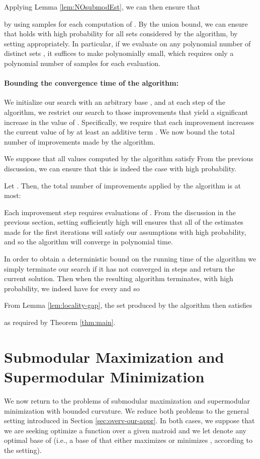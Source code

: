 \documentclass{article}
\theoremstyle{definition}
\begin{document}
Applying Lemma \ref{lem:NOsubmodEst}, we can then ensure that

by using  samples for each computation of .  By the union bound, we can ensure that  holds with high probability for all sets  considered by the algorithm, by setting  appropriately.  In particular, if we evaluate  on any polynomial number of distinct sets , it suffices to make  polynomially small, which requires only  a polynomial number of samples for each evaluation.

\paragraph{Bounding the convergence time of the algorithm:}

We initialize our search with an arbitrary base , and at each step of the algorithm, we restrict our search to those improvements that yield a significant increase in the value of .  Specifically, we require that each improvement increases the current value of  by at least an additive term .  We now bound the total number of improvements made by the algorithm.

We suppose that all values  computed by the algorithm satisfy
  From the previous discussion, we can ensure that this is indeed the case with high probability.

Let .  Then, the total number of improvements applied by the algorithm is at most:

Each improvement step requires  evaluations of .  From the discussion in the previous section, setting  sufficiently high will ensures that all of the estimates made for the first  iterations will satisfy our assumptions with high probability, and so the algorithm will converge in polynomial time.  

In order to obtain a deterministic bound on the running time of the algorithm we simply terminate our search if it has not converged in  steps and return the current solution.  Then when the resulting algorithm terminates, with high probability, we indeed have  for every  and so
 
From Lemma \ref{lem:locality-gap}, the set  produced by the algorithm then satisfies

as required by Theorem \ref{thm:main}.

\section{Submodular Maximization and Supermodular Minimization}
\label{sec:applications}
We now return to the problems of submodular maximization and supermodular minimization with bounded curvature.  We reduce both problems to the general setting introduced in Section \ref{sec:overv-our-appr}.  In both cases, we suppose that we are seeking optimize a function  over a given matroid  and we let  denote any optimal base of  (i.e., a base of  that either maximizes or minimizes , according to the setting).
\end{document}
